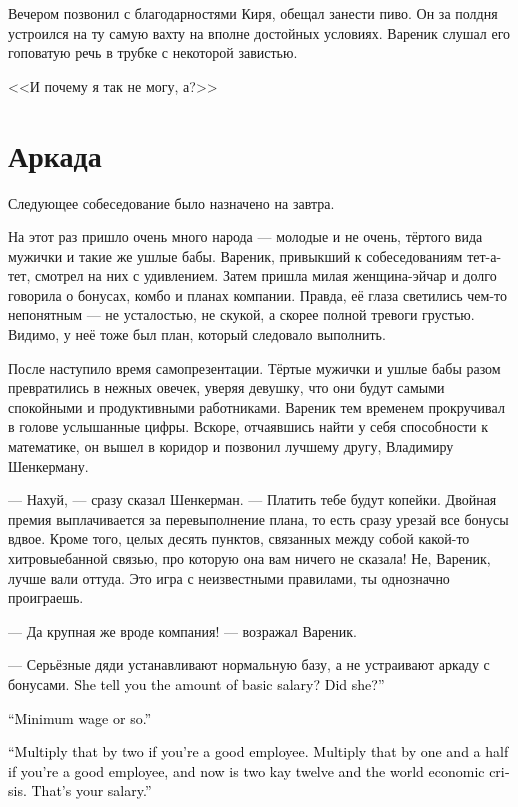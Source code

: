 \documentclass[a4paper,10pt,fleqn]{book}\usepackage{polyglossia}\setdefaultlanguage{english}\setotherlanguage{russian}\defaultfontfeatures{Ligatures=TeX,Mapping=tex-text} \usepackage{xcolor}\definecolor{lightgray}{HTML}{bbbbbb}\color{lightgray}\newcommand{\ml}[3]{\textcolor{black}{#3}}
\begin{document}
Вечером позвонил с благодарностями Киря, обещал занести пиво.
Он за полдня устроился на ту самую вахту на вполне достойных условиях.
Вареник слушал его гоповатую речь в трубке с некоторой завистью.

<<И почему я так не могу, а?>>

\section{Аркада}

Следующее собеседование было назначено на завтра.

На этот раз пришло очень много народа --- молодые и не очень, тёртого вида мужички и такие же ушлые бабы.
Вареник, привыкший к собеседованиям тет-а-тет, смотрел на них с удивлением.
Затем пришла милая женщина-эйчар и долго говорила о бонусах, комбо и планах компании.
Правда, её глаза светились чем-то непонятным --- не усталостью, не скукой, а скорее полной тревоги грустью.
Видимо, у неё тоже был план, который следовало выполнить.

После наступило время самопрезентации.
Тёртые мужички и ушлые бабы разом превратились в нежных овечек, уверяя девушку, что они будут самыми спокойными и продуктивными работниками.
Вареник тем временем прокручивал в голове услышанные цифры.
Вскоре, отчаявшись найти у себя способности к математике, он вышел в коридор и позвонил лучшему другу, Владимиру Шенкерману.

--- Нахуй, --- сразу сказал Шенкерман.
--- Платить тебе будут копейки.
Двойная премия выплачивается за перевыполнение плана, то есть сразу урезай все бонусы вдвое.
Кроме того, целых десять пунктов, связанных между собой какой-то хитровыебанной связью, про которую она вам ничего не сказала!
Не, Вареник, лучше вали оттуда.
Это игра с неизвестными правилами, ты однозначно проиграешь.

--- Да крупная же вроде компания! --- возражал Вареник.

--- Серьёзные дяди устанавливают нормальную базу, а не устраивают аркаду с бонусами.
\ml{$0$}
{Она сказала тебе размер базового оклада?}
{She tell you the amount of basic salary?}
\ml{$0$}
{Сказала?}
{Did she?''}

\ml{$0$}
{--- МРОТ.}
{``Minimum wage or so.''}

\ml{$0$}
{--- Умножь его на два, если ты хороший работник.}
{``Multiply that by two if you're a good employee.}
\ml{$0$}
{Умножь его на полтора, если ты хороший работник, а на дворе две тысячи двенадцатый год и кризис.}
{Multiply that by one and a half if you're a good employee, and now is two kay twelve and the world economic crisis.}
\ml{$0$}
{Вот твоя зарплата.}
{That's your salary.''}
\end{document}

